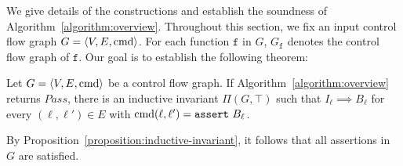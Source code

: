 
We give details of the constructions and establish the soundness of
Algorithm~\ref{algorithm:overview}. Throughout this section, we fix an
input control flow graph $G = \langle V, E, \textmd{cmd} \rangle$. For
each function $\mathtt{f}$ in $G$, $G_{\mathtt{f}}$ denotes the
control flow graph of $\mathtt{f}$. Our goal is to establish the
following theorem:

\begin{theorem}
  Let $G = \langle V, E, \textmd{cmd} \rangle$ be a control flow
  graph. If Algorithm~\ref{algorithm:overview} returns
  $\mathit{Pass}$, there is an inductive invariant $\Pi (G, \top)$
  such that $I_{\ell} \implies B_{\ell}$ for every $(\ell, \ell') \in
  E$ with $\textmd{cmd} (\ell, \ell') = \mathtt{assert\ } B_{\ell}$.
  \label{theorem:soundness}
\end{theorem}

By Proposition~\ref{proposition:inductive-invariant}, it follows that
all assertions in $G$ are satisfied.